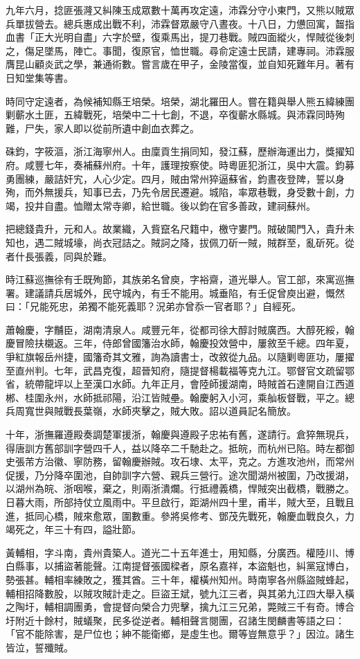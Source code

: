 \begin{pinyinscope}
九年六月，捻匪張漋又糾陳玉成眾數十萬再攻定遠，沛霖分守小東門，又熊以賊眾兵單拔營去。總兵惠成出戰不利，沛霖督眾嚴守八晝夜。十八日，力憊回寓，齧指血書「正大光明自盡」六字於壁，復乘馬出，提刀巷戰。賊四面縱火，悍賊從後刺之，傷足墜馬，陣亡。事聞，復原官，恤世職。尋俞定遠士民請，建專祠。沛霖服膺昆山顧炎武之學，兼通術數。嘗言歲在甲子，金陵當復，並自知死難年月。著有日知堂集等書。

時同守定遠者，為候補知縣王培榮。培榮，湖北羅田人。嘗在籍與舉人熊五緯練團剿蘄水土匪，五緯戰死，培榮中二十七創，不退，卒復蘄水縣城。與沛霖同時殉難，尸失，家人即以從前所遺中創血衣葬之。

硃鈞，字筱漚，浙江海寧州人。由廩貢生捐同知，發江蘇，歷辦海運出力，獎擢知府。咸豐七年，奏補蘇州府。十年，護理按察使。時粵匪犯浙江，吳中大震。鈞募勇團練，嚴詰奸宄，人心少定。四月，賊由常州猝逼蘇省，鈞晝夜登陴，誓以身殉，而外無援兵，知事已去，乃先令居民遷避。城陷，率眾巷戰，身受數十創，力竭，投井自盡。恤贈太常寺卿，給世職。後以鈞在官多善政，建祠蘇州。

把總錢貴升，元和人。故業織，入貲竄名尺籍中，檄守婁門。賊破閶門入，貴升未知也，遇二賊城壕，尚衣冠詰之。賊訶之降，拔佩刀斫一賊，賊群至，亂斫死。從者什長張義，同與於難。

時江蘇巡撫徐有壬既殉節，其族弟名曾庾，字裕齋，道光舉人。官工部，來寓巡撫署。建議請兵居城外，民守城內，有壬不能用。城垂陷，有壬促曾庾出避，慨然曰：「兄能死忠，弟獨不能死義耶？況弟亦曾忝一官者耶？」自經死。

蕭翰慶，字黼臣，湖南清泉人。咸豐元年，從都司徐大醇討賊廣西。大醇死綏，翰慶冒險扶櫬返。三年，侍郎曾國籓治水師，翰慶投效營中，屢敘至千總。四年夏，爭紅旗報岳州捷，國籓奇其文雅，詢為讀書士，改敘從九品。以隨剿粵匪功，屢擢至直州判。七年，武昌克復，超晉知府，隨提督楊載福等克九江。鄂督官文疏留鄂省，統帶龍坪以上至漢口水師。九年正月，會陸師援湖南，時賊首石達開自江西道郴、桂圍永州，水師抵祁陽，沿江皆賊壘。翰慶躬入小河，乘舢板督戰，平之。總兵周寬世與賊戰長葉嶺，水師夾擊之，賊大敗。詔以道員記名簡放。

十年，浙撫羅遵殿奏調楚軍援浙，翰慶與遵殿子忠祐有舊，遂請行。倉猝無現兵，得唐訓方舊部訓字營四千人，益以降卒二千馳赴之。抵皖，而杭州已陷。時左都御史張芾方治徽、寧防務，留翰慶辦賊。攻石埭、太平，克之。方進攻池州，而常州促援，乃分降卒圍池，自帥訓字六營、親兵三營行。途次聞湖州被圍，乃改援湖，以湖州為皖、浙咽喉，棄之，則兩浙潰爛。行抵禮義橋，悍賊突出截橋，戰勝之。日暮大雨，所部持仗立風雨中。平旦啟行，距湖州四十里，甫半，賊大至，且戰且進，抵同心橋，賊來愈眾，圍數重。參將吳修考、鄧茂先戰死，翰慶血戰良久，力竭死之，年三十有四，謚壯節。

黃輔相，字斗南，貴州貴築人。道光二十五年進士，用知縣，分廣西。權陸川、博白縣事，以捕盜著能聲。江南提督張國樑者，原名嘉祥，本盜魁也，糾黨寇博白，勢張甚。輔相率練敗之，獲其酋。三十年，權橫州知州。時南寧各州縣盜賊蜂起，輔相招降數股，以賊攻賊計走之。巨盜王斌，號九江三者，與其弟九江四大舉入橫之陶圩，輔相調團勇，會提督向榮合力兜擊，擒九江三兄弟，斃賊三千有奇。博合圩附近十餘村，賊蟻聚，民多從逆者。輔相聲言閱團，召諸生閔麟書等語之曰：「官不能除害，是尸位也；紳不能衛鄉，是虛生也。爾等豈無意乎？」因泣。諸生皆泣，誓殲賊。


\end{pinyinscope}
